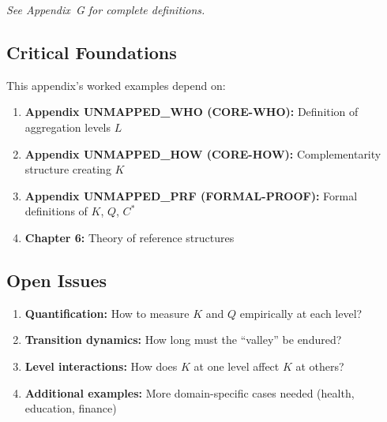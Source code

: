 \noindent\textit{See Appendix~G for complete definitions.}


\subsection{Critical Foundations}

\begin{tcolorbox}[colback=red!5!white, colframe=red!75!black,
    title=\textbf{Critical Foundations for Appendix UNMAPPED_EXM}]

This appendix's worked examples depend on:

\begin{enumerate}
    \item \textbf{Appendix UNMAPPED_WHO (CORE-WHO):} Definition of aggregation levels $L$
    \item \textbf{Appendix UNMAPPED_HOW (CORE-HOW):} Complementarity structure creating $K$
    \item \textbf{Appendix UNMAPPED_PRF (FORMAL-PROOF):} Formal definitions of $K$, $Q$, $C^*$
    \item \textbf{Chapter 6:} Theory of reference structures
\end{enumerate}

\end{tcolorbox}


\subsection{Open Issues}

\begin{enumerate}
    \item \textbf{Quantification:} How to measure $K$ and $Q$ empirically at each level?
    \item \textbf{Transition dynamics:} How long must the ``valley'' be endured?
    \item \textbf{Level interactions:} How does $K$ at one level affect $K$ at others?
    \item \textbf{Additional examples:} More domain-specific cases needed (health, education, finance)
\end{enumerate}

